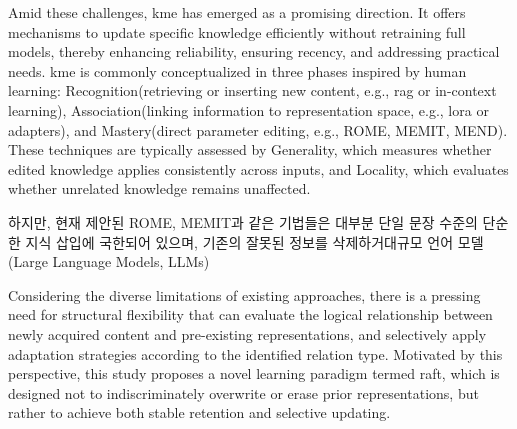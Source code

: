 \documentclass[a4paper,fleqn]{cas-sc}
\begin{document}
Amid these challenges, \gls{kme} has emerged as a promising direction.
It offers mechanisms to update specific knowledge efficiently without retraining full models, thereby enhancing reliability, ensuring recency, and addressing practical needs.
\gls{kme} is commonly conceptualized in three phases inspired by human learning: Recognition(retrieving or inserting new content, e.g., \gls{rag} or in-context learning), Association(linking information to representation space, e.g., \gls{lora} or adapters), and Mastery(direct parameter editing, e.g., ROME, MEMIT, MEND).
These techniques are typically assessed by Generality, which measures whether edited knowledge applies consistently across inputs, and Locality, which evaluates whether unrelated knowledge remains unaffected.

하지만, 현재 제안된 ROME, MEMIT과 같은 기법들은 대부분 단일 문장 수준의 단순한 지식 삽입에 국한되어 있으며, 기존의 잘못된 정보를 삭제하거대규모 언어 모델(Large Language Models, LLMs)

Considering the diverse limitations of existing approaches, there is a pressing need for structural flexibility that can evaluate the logical relationship between newly acquired content and pre-existing representations, and selectively apply adaptation strategies according to the identified relation type.
Motivated by this perspective, this study proposes a novel learning paradigm termed \gls{raft}, which is designed not to indiscriminately overwrite or erase prior representations, but rather to achieve both stable retention and selective updating.
\end{document}
